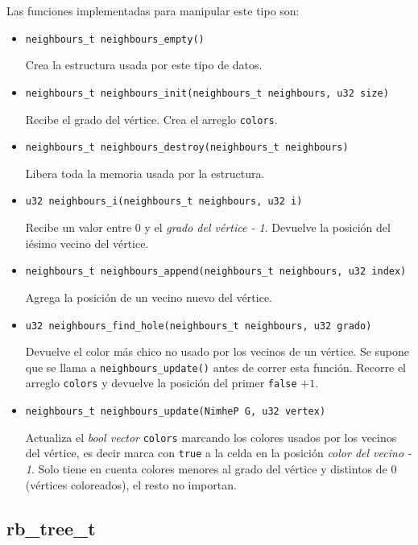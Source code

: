 \documentclass[11pt]{article}   	%
\begin{document}
Las funciones implementadas para manipular este tipo son:
\begin{itemize}
\item \texttt{neighbours\_t neighbours\_empty()}

Crea la estructura usada por este tipo de datos.

\item \texttt{neighbours\_t neighbours\_init(neighbours\_t neighbours, u32 size)}

Recibe el grado del vértice. Crea el arreglo \texttt{colors}.

\item \texttt{neighbours\_t neighbours\_destroy(neighbours\_t neighbours)}

Libera toda la memoria usada por la estructura.

\item \texttt{u32 neighbours\_i(neighbours\_t neighbours, u32 i)}

Recibe un valor entre 0 y el \emph{grado del vértice - 1}. Devuelve la posición del
iésimo vecino del vértice.

\item \texttt{neighbours\_t neighbours\_append(neighbours\_t neighbours, u32 index)}

Agrega la posición de un vecino nuevo del vértice.

\item \texttt{u32 neighbours\_find\_hole(neighbours\_t neighbours, u32 grado)}

Devuelve el color más chico no usado por los vecinos de un vértice. Se supone
que se llama a \texttt{neighbours\_update()} antes de correr esta función.
Recorre el arreglo \texttt{colors} y devuelve la posición del primer
\texttt{false} $+ 1$.

\item \texttt{neighbours\_t neighbours\_update(NimheP G, u32 vertex)}

Actualiza el \emph{bool vector} \texttt{colors} marcando los colores usados por
los vecinos del vértice, es decir marca con \texttt{true} a la celda en la
posición \emph{color del vecino - 1}. Solo tiene en cuenta colores menores al
grado del vértice y distintos de 0 (vértices coloreados), el resto no importan.
\end{itemize}

\subsection{rb\_tree\_t}
\end{document}
